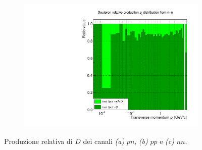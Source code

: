 \begin{figure}[htbp]
\begin{subfigure}{.49\textwidth}
        \includegraphics[width=\textwidth]{image/3-risultati/deuteron_analyse/A/n_n_stack.pdf}
        \caption{}
        \label{fig:A_nn_stack_deut}
    \end{subfigure}
    \caption{Produzione relativa di $D$ dei canali \emph{\rmfamily (a)} $pn$, \emph{\rmfamily (b)} $pp$ e \emph{\rmfamily (c)} $nn$.}
    \label{fig:A_deut_subchannels}
\end{figure}
